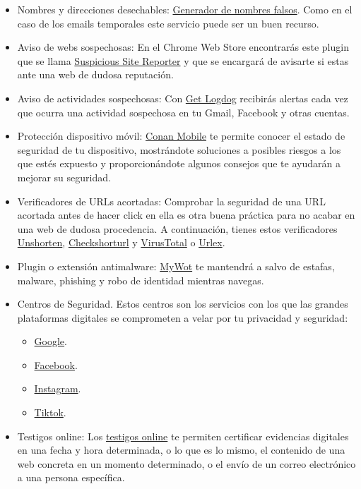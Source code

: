 \documentclass[
  a4paper,
  openany]{book}
\begin{document}
\begin{itemize}
\item
  Nombres y direcciones desechables: \href{https://www.fakenamegenerator.com}{Generador de nombres falsos}. Como en el caso de los emails temporales este servicio puede ser un buen recurso.
\item
  Aviso de webs sospechosas: En el Chrome Web Store encontrarás este plugin que se llama \href{https://chrome.google.com/webstore/detail/suspicious-site-reporter/jknemblkbdhdcpllfgbfekkdciegfboi}{Suspicious Site Reporter} y que se encargará de avisarte si estas ante una web de dudosa reputación.
\item
  Aviso de actividades sospechosas: Con \href{https://getlogdog.com/}{Get Logdog} recibirás alertas cada vez que ocurra una actividad sospechosa en tu Gmail, Facebook y otras cuentas.
\item
  Protección dispositivo móvil: \href{https://www.osi.es/es/conan-mobile}{Conan Mobile} te permite conocer el estado de seguridad de tu dispositivo, mostrándote soluciones a posibles riesgos a los que estés expuesto y proporcionándote algunos consejos que te ayudarán a mejorar su seguridad.
\item
  Verificadores de URLs acortadas: Comprobar la seguridad de una URL acortada antes de hacer click en ella es otra buena práctica para no acabar en una web de dudosa procedencia. A continuación, tienes estos verificadores \href{https://unshorten.it/}{Unshorten}, \href{https://checkshorturl.com/}{Checkshorturl} y \href{https://www.virustotal.com/gui/home/url}{VirusTotal} o \href{https://urlex.org/}{Urlex}.
\item
  Plugin o extensión antimalware: \href{https://www.mywot.com/}{MyWot} te mantendrá a salvo de estafas, malware, phishing y robo de identidad mientras navegas.
\item
  Centros de Seguridad. Estos centros son los servicios con los que las grandes plataformas digitales se comprometen a velar por tu privacidad y seguridad:

  \begin{itemize}
  \item
    \href{https://safety.google}{Google}.
  \item
    \href{https://es-es.facebook.com/safety}{Facebook}.
  \item
    \href{https://about.instagram.com/es-la/community/safety}{Instagram}.
  \item
    \href{https://www.tiktok.com/safety?lang=es}{Tiktok}.
  \end{itemize}
\item
  Testigos online: Los \href{https://www.osi.es/es/actualidad/blog/2022/01/26/testigos-online-y-obtencion-de-pruebas-te-explicamos-su-utilidad}{testigos online} te permiten certificar evidencias digitales en una fecha y hora determinada, o lo que es lo mismo, el contenido de una web concreta en un momento determinado, o el envío de un correo electrónico a una persona específica.
\end{itemize}
\end{document}
